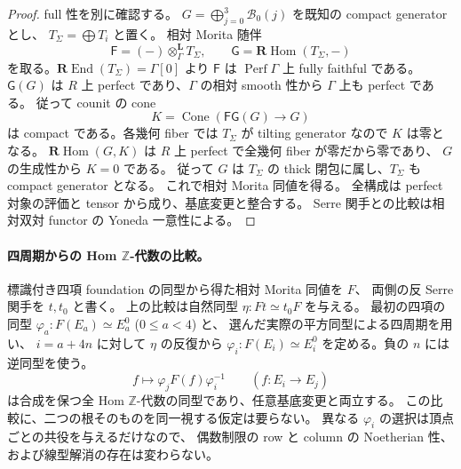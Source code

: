 \begin{proof}
full 性を別に確認する。
$G=\bigoplus_{j=0}^3\mathcal B_0(j)$ を既知の compact generator とし、
$T_\Sigma=\bigoplus T_i$ と置く。
相対 Morita 随伴
\[
 \mathsf F=(-)\otimes_\Gamma^{\mathbf L}T_\Sigma,
 \qquad \mathsf G=\mathbf R\operatorname{Hom}(T_\Sigma,-)
\]
を取る。$\mathbf R\operatorname{End}(T_\Sigma)=\Gamma[0]$ より
$\mathsf F$ は $\operatorname{Perf}\Gamma$ 上 fully faithful である。
$\mathsf G(G)$ は $R$ 上 perfect であり、$\Gamma$ の相対 smooth 性から
$\Gamma$ 上も perfect である。
従って counit の cone
\[
 K=\operatorname{Cone}(\mathsf F\mathsf G(G)\longrightarrow G)
\]
は compact である。各幾何 fiber では $T_\Sigma$ が tilting generator なので $K$ は零となる。
$\mathbf R\operatorname{Hom}(G,K)$ は $R$ 上 perfect で全幾何 fiber が零だから零であり、
$G$ の生成性から $K=0$ である。
従って $G$ は $T_\Sigma$ の thick 閉包に属し、$T_\Sigma$ も compact generator となる。
これで相対 Morita 同値を得る。
全構成は perfect 対象の評価と tensor から成り、基底変更と整合する。
Serre 関手との比較は相対双対 functor の Yoneda 一意性による。
\end{proof}

\paragraph{四周期からの Hom $\mathbb Z$-代数の比較。}
標識付き四項 foundation の同型から得た相対 Morita 同値を $F$、
両側の反 Serre 関手を $t,t_0$ と書く。
上の比較は自然同型 $\eta:Ft\simeq t_0F$ を与える。
最初の四項の同型 $\varphi_a:F(E_a)\simeq E_a^0$ ($0\le a<4$) と、
選んだ実際の平方同型による四周期を用い、
$i=a+4n$ に対して $\eta$ の反復から
$\varphi_i:F(E_i)\simeq E_i^0$ を定める。負の $n$ には逆同型を使う。
\[
 f\longmapsto\varphi_jF(f)\varphi_i^{-1}
 \qquad(f:E_i\longrightarrow E_j)
\]
は合成を保つ全 Hom $\mathbb Z$-代数の同型であり、任意基底変更と両立する。
この比較に、二つの根そのものを同一視する仮定は要らない。
異なる $\varphi_i$ の選択は頂点ごとの共役を与えるだけなので、
偶数制限の row と column の Noetherian 性、および線型解消の存在は変わらない。



